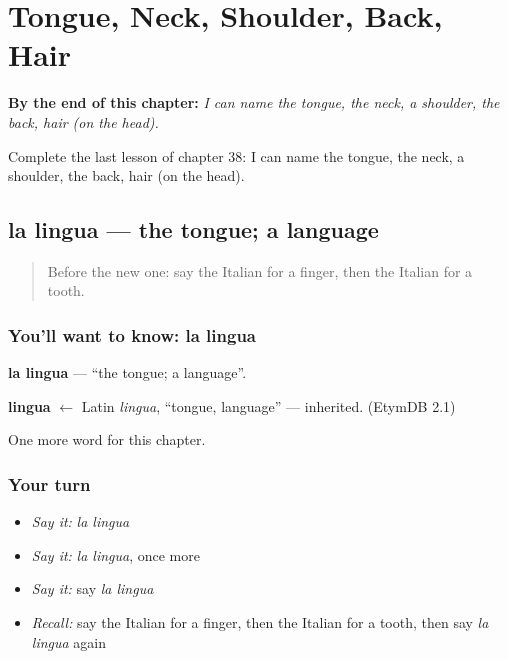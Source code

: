 
\chapter{Tongue, Neck, Shoulder, Back, Hair}
\label{ch:it-tongue-neck-shoulder-back-hair}

\begin{chapteropening}
\textbf{By the end of this chapter:} \emph{I can name the tongue, the neck, a shoulder, the back, hair (on the head).}

Complete the last lesson of chapter 38: I can name the tongue, the neck, a shoulder, the back, hair (on the head).
\end{chapteropening}

\section[la lingua]{la lingua — the tongue; a language}

\label{lesson:IT-C38-lingua}



\begin{quote}
Before the new one: say the Italian for a finger, then the Italian for a tooth.
\end{quote}

\subsection*{You'll want to know: la lingua}
\textbf{la lingua} — \textquotedblleft{}the tongue; a language\textquotedblright{}.

\begin{cousinweb}
\textbf{lingua} $\leftarrow$ Latin \emph{lingua}, \textquotedblleft{}tongue, language\textquotedblright{} — inherited. (EtymDB 2.1)
\end{cousinweb}

\begin{grammarlens}[title={What you've built}]
One more word for this chapter.
\end{grammarlens}

\subsection*{Your turn}
\begin{itemize}
\raggedright
  \item \emph{Say it:} \emph{la lingua}
  \item \emph{Say it:} \emph{la lingua}, once more
  \item \emph{Say it:} say \emph{la lingua}
  \item \emph{Recall:} say the Italian for a finger, then the Italian for a tooth, then say \emph{la lingua} again
\end{itemize}

